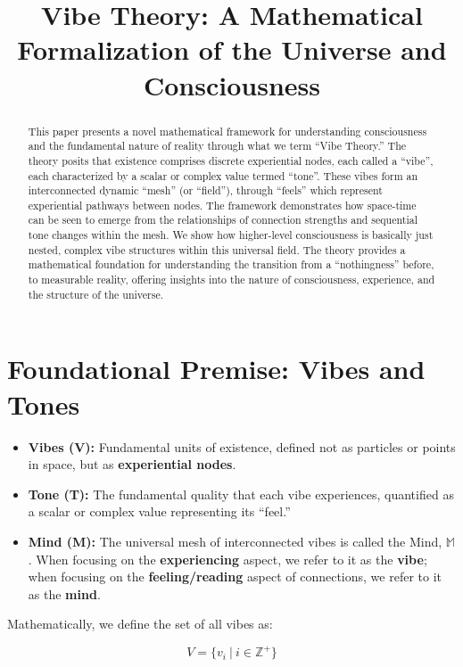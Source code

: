 \documentclass{article}
\title{Vibe Theory: A Mathematical Formalization of the Universe and Consciousness}
\author{}
\date{}
\begin{document}
\maketitle

\begin{abstract}
This paper presents a novel mathematical framework for understanding consciousness and the fundamental nature of reality through what we term ``Vibe Theory.'' The theory posits that existence comprises discrete experiential nodes, each called a ``vibe'', each characterized by a scalar or complex value termed ``tone''. These vibes form an interconnected dynamic ``mesh'' (or ``field''), through ``feels'' which represent experiential pathways between nodes. The framework demonstrates how space-time can be seen to emerge from the relationships of connection strengths and sequential tone changes within the mesh. We show how higher-level consciousness is basically just nested, complex vibe structures within this universal field. The theory provides a mathematical foundation for understanding the transition from a ``nothingness'' before, to measurable reality, offering insights into the nature of consciousness, experience, and the structure of the universe.
\end{abstract}

\section{Foundational Premise: Vibes and Tones}

\begin{itemize}
\item \textbf{Vibes (V):} Fundamental units of existence, defined not as particles or points in space, but as \textbf{experiential nodes}.
\item \textbf{Tone (T):} The fundamental quality that each vibe experiences, quantified as a scalar or complex value representing its ``feel.''
\item \textbf{Mind (M):} The universal mesh of interconnected vibes is called the Mind, $\mathbb{M}$. When focusing on the \textbf{experiencing} aspect, we refer to it as the \textbf{vibe}; when focusing on the \textbf{feeling/reading} aspect of connections, we refer to it as the \textbf{mind}.
\end{itemize}

Mathematically, we define the set of all vibes as:

\[
V = \{ v_i \ | \ i \in \mathbb{Z}^+ \}
\]
\end{document}
